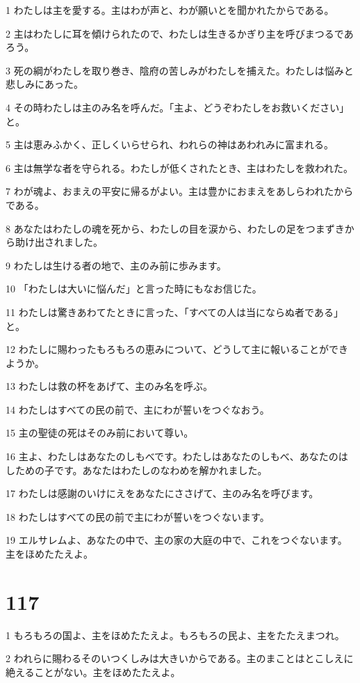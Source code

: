 \par 1 わたしは主を愛する。主はわが声と、わが願いとを聞かれたからである。
\par 2 主はわたしに耳を傾けられたので、わたしは生きるかぎり主を呼びまつるであろう。
\par 3 死の綱がわたしを取り巻き、陰府の苦しみがわたしを捕えた。わたしは悩みと悲しみにあった。
\par 4 その時わたしは主のみ名を呼んだ。「主よ、どうぞわたしをお救いください」と。
\par 5 主は恵みふかく、正しくいらせられ、われらの神はあわれみに富まれる。
\par 6 主は無学な者を守られる。わたしが低くされたとき、主はわたしを救われた。
\par 7 わが魂よ、おまえの平安に帰るがよい。主は豊かにおまえをあしらわれたからである。
\par 8 あなたはわたしの魂を死から、わたしの目を涙から、わたしの足をつまずきから助け出されました。
\par 9 わたしは生ける者の地で、主のみ前に歩みます。
\par 10 「わたしは大いに悩んだ」と言った時にもなお信じた。
\par 11 わたしは驚きあわてたときに言った、「すべての人は当にならぬ者である」と。
\par 12 わたしに賜わったもろもろの恵みについて、どうして主に報いることができようか。
\par 13 わたしは救の杯をあげて、主のみ名を呼ぶ。
\par 14 わたしはすべての民の前で、主にわが誓いをつぐなおう。
\par 15 主の聖徒の死はそのみ前において尊い。
\par 16 主よ、わたしはあなたのしもべです。わたしはあなたのしもべ、あなたのはしための子です。あなたはわたしのなわめを解かれました。
\par 17 わたしは感謝のいけにえをあなたにささげて、主のみ名を呼びます。
\par 18 わたしはすべての民の前で主にわが誓いをつぐないます。
\par 19 エルサレムよ、あなたの中で、主の家の大庭の中で、これをつぐないます。主をほめたたえよ。

\chapter{117}

\par 1 もろもろの国よ、主をほめたたえよ。もろもろの民よ、主をたたえまつれ。
\par 2 われらに賜わるそのいつくしみは大きいからである。主のまことはとこしえに絶えることがない。主をほめたたえよ。

